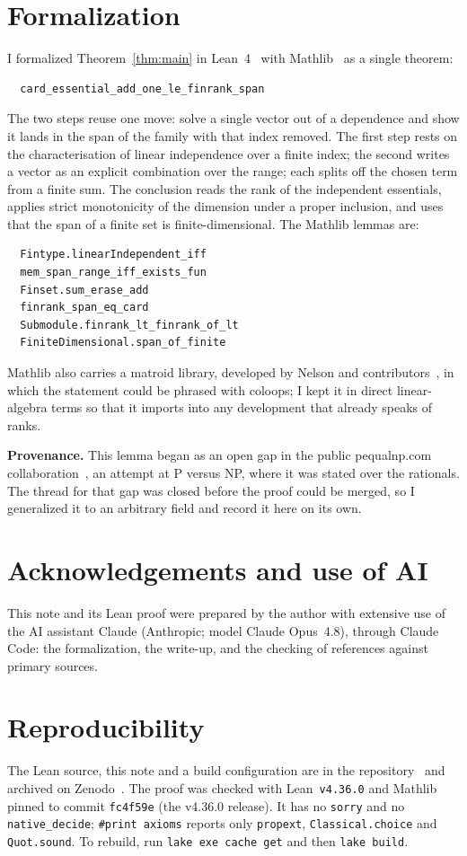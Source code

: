 \documentclass[11pt]{amsart}
\theoremstyle{definition}
\theoremstyle{remark}
\begin{document}
\section{Formalization}\label{sec:formal}
I formalized Theorem~\ref{thm:main} in Lean~4~\cite{Lean4} with Mathlib~\cite{Mathlib} as a
single theorem:
\begin{verbatim}
  card_essential_add_one_le_finrank_span
\end{verbatim}
The two steps reuse one move: solve a single vector out of a dependence and show it lands in the
span of the family with that index removed. The first step rests on the characterisation of
linear independence over a finite index; the second writes a vector as an explicit combination
over the range; each splits off the chosen term from a finite sum. The conclusion reads the rank
of the independent essentials, applies strict monotonicity of the dimension under a proper
inclusion, and uses that the span of a finite set is finite-dimensional. The Mathlib lemmas are:
\begin{verbatim}
  Fintype.linearIndependent_iff
  mem_span_range_iff_exists_fun
  Finset.sum_erase_add
  finrank_span_eq_card
  Submodule.finrank_lt_finrank_of_lt
  FiniteDimensional.span_of_finite
\end{verbatim}
Mathlib also carries a matroid library, developed by Nelson and contributors~\cite{Nelson}, in
which the statement could be phrased with coloops; I kept it in direct linear-algebra terms so
that it imports into any development that already speaks of ranks.

\smallskip\noindent\textbf{Provenance.}
This lemma began as an open gap in the public pequalnp.com collaboration~\cite{pequalnp}, an
attempt at P versus NP, where it was stated over the rationals. The thread for that gap was
closed before the proof could be merged, so I generalized it to an arbitrary field and record
it here on its own.

\section*{Acknowledgements and use of AI}
This note and its Lean proof were prepared by the author with extensive use of the AI assistant
Claude (Anthropic; model Claude Opus~4.8), through Claude Code: the formalization, the
write-up, and the checking of references against primary sources.

\appendix
\section{Reproducibility}\label{app:repro}
The Lean source, this note and a build configuration are in the repository~\cite{Repo} and
archived on Zenodo~\cite{Zenodo}. The proof was checked with Lean~\texttt{v4.36.0} and Mathlib
pinned to commit \texttt{fc4f59e} (the v4.36.0 release). It has no \texttt{sorry} and no
\texttt{native\_decide}; \texttt{\#print axioms} reports only \texttt{propext},
\texttt{Classical.choice} and \texttt{Quot.sound}. To rebuild, run \texttt{lake exe cache get}
and then \texttt{lake build}.
\end{document}

